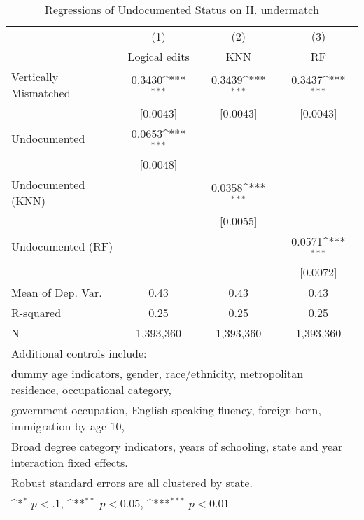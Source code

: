 \begin{table}[htbp]\centering
\def\sym#1{\ifmmode^{#1}\else\(^{#1}\)\fi}
\caption{Regressions of Undocumented Status on H. undermatch}
\begin{tabular}{l*{3}{c}}
\toprule
                    &\multicolumn{1}{c}{(1)}         &\multicolumn{1}{c}{(2)}         &\multicolumn{1}{c}{(3)}         \\
                    &Logical edits         &         KNN         &          RF         \\
\midrule
Vertically Mismatched&      0.3430\sym{***}&      0.3439\sym{***}&      0.3437\sym{***}\\
                    &    [0.0043]         &    [0.0043]         &    [0.0043]         \\
\addlinespace
Undocumented        &      0.0653\sym{***}&                     &                     \\
                    &    [0.0048]         &                     &                     \\
\addlinespace
Undocumented (KNN)  &                     &      0.0358\sym{***}&                     \\
                    &                     &    [0.0055]         &                     \\
\addlinespace
Undocumented (RF)   &                     &                     &      0.0571\sym{***}\\
                    &                     &                     &    [0.0072]         \\
\midrule
Mean of Dep. Var.   &        0.43         &        0.43         &        0.43         \\
R-squared           &        0.25         &        0.25         &        0.25         \\
N                   &   1,393,360         &   1,393,360         &   1,393,360         \\
\bottomrule
\multicolumn{4}{l}{\footnotesize Additional controls include:}\\
\multicolumn{4}{l}{\footnotesize dummy age indicators, gender, race/ethnicity, metropolitan residence, occupational category,}\\
\multicolumn{4}{l}{\footnotesize government occupation, English-speaking fluency, foreign born, immigration by age 10,}\\
\multicolumn{4}{l}{\footnotesize Broad degree category indicators, years of schooling, state and year interaction fixed effects.}\\
\multicolumn{4}{l}{\footnotesize Robust standard errors are all clustered by state.}\\
\multicolumn{4}{l}{\footnotesize \sym{*} \(p<.1\), \sym{**} \(p<0.05\), \sym{***} \(p<0.01\)}\\
\end{tabular}
\end{table}
